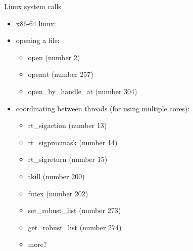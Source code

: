 \begin{frame}[fragile,label=howManySystemCalls]{Linux system calls}
\begin{itemize}
\item x86-64 linux: 
\item opening a file:
    \begin{itemize}
    \item open (number 2)
    \item openat (number 257)
    \item open\_by\_handle\_at (number 304)
    \end{itemize}
\item coordinating between threads (for using multiple cores):
    \begin{itemize}
    \item rt\_sigaction (number 13)
    \item rt\_sigprocmask (number 14)
    \item rt\_sigreturn (number 15)
    \item tkill (number 200)
    \item futex (number 202)
    \item set\_robust\_list (number 273)
    \item get\_robust\_list (number 274)
    \item more?
    \end{itemize}
\end{itemize}
\end{frame}

